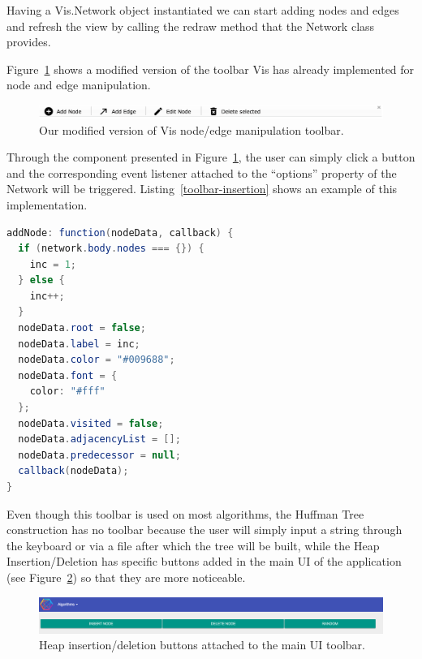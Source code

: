 \documentclass{l4proj}
\begin{document}
Having a Vis.Network object instantiated we can start adding nodes and edges and refresh the view by
calling the redraw method that the Network class provides. 

Figure~\ref{fig:palgo-toolbar} shows a modified version of the toolbar Vis has already implemented for node and edge
manipulation.

\pagebreak

\begin{figure}[!ht]
\centering
\includegraphics[scale=0.5]{palgo-toolbar}
\caption{Our modified version of Vis node/edge manipulation toolbar.}
\label{fig:palgo-toolbar}
\end{figure}

Through the component presented in Figure~\ref{fig:palgo-toolbar}, the user can simply click a button and the
corresponding
event listener attached to the ``options'' property of the Network will be triggered. Listing~\ref{toolbar-insertion} shows an example of this implementation.

\begin{lstlisting}[language={Java}, label={toolbar-insertion},caption={Custom event listener that adds node to the
graph when the user clicks the ``Add Node'' button.}]
addNode: function(nodeData, callback) {
  if (network.body.nodes === {}) {
    inc = 1;
  } else {
    inc++;
  }
  nodeData.root = false;
  nodeData.label = inc;
  nodeData.color = "#009688";
  nodeData.font = {
    color: "#fff"
  };
  nodeData.visited = false;
  nodeData.adjacencyList = [];
  nodeData.predecessor = null;
  callback(nodeData);
}
\end{lstlisting}

Even though this toolbar is used on most algorithms, the Huffman Tree construction has no toolbar because the user will simply input a string through the keyboard or via a file after which the tree will be built, while the Heap Insertion/Deletion has specific buttons added in the main UI of the application (see Figure~\ref{fig:heap-toolbar}) so that they are more noticeable.

\begin{figure}[!ht]
    \centering
    \includegraphics[scale=0.3]{heap-toolbar}
    \caption{Heap insertion/deletion buttons attached to the main UI toolbar.}
    \label{fig:heap-toolbar}
\end{figure}
\end{document}
